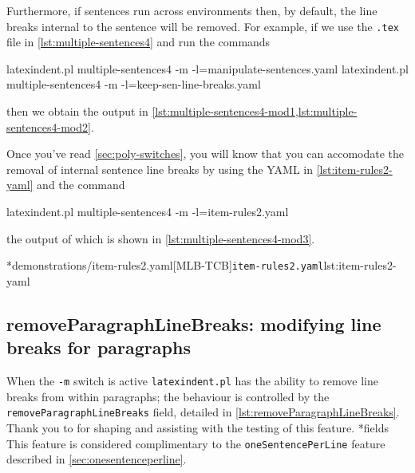 	Furthermore, if sentences run across environments then, by default, the line breaks internal to the sentence will be removed.
	For example, if we use the \texttt{.tex} file in \cref{lst:multiple-sentences4} and run the commands \begin{commandshell}
latexindent.pl multiple-sentences4 -m -l=manipulate-sentences.yaml
latexindent.pl multiple-sentences4 -m -l=keep-sen-line-breaks.yaml
	\end{commandshell} then we obtain the output in \cref{lst:multiple-sentences4-mod1,lst:multiple-sentences4-mod2}.
	\begin{widepage}
	\end{widepage}
	Once you've read \cref{sec:poly-switches}, you will know that you can accomodate the removal of internal sentence line breaks by using the YAML in \cref{lst:item-rules2-yaml} and the command \begin{commandshell}
latexindent.pl multiple-sentences4 -m -l=item-rules2.yaml
	\end{commandshell} the output of which is shown in \cref{lst:multiple-sentences4-mod3}.

	\begin{minipage}{.5\linewidth}
	\end{minipage}
	\hfill
	\begin{minipage}{.5\linewidth}
		\cmhlistingsfromfile[style=yaml-LST]*{demonstrations/item-rules2.yaml}[MLB-TCB]{\texttt{item-rules2.yaml}}{lst:item-rules2-yaml}
	\end{minipage}

\subsection{removeParagraphLineBreaks: modifying line breaks for paragraphs}
	When the \texttt{-m} switch is active \texttt{latexindent.pl} has the ability to remove line breaks%
	 from within paragraphs; the behaviour is controlled by the \texttt{removeParagraphLineBreaks} field, detailed in \cref{lst:removeParagraphLineBreaks}.
	Thank you to \cite{jowens} for shaping and assisting with the testing of this feature.
*{fields}
	This feature is considered complimentary to the \texttt{oneSentencePerLine} feature described in \vref{sec:onesentenceperline}.

